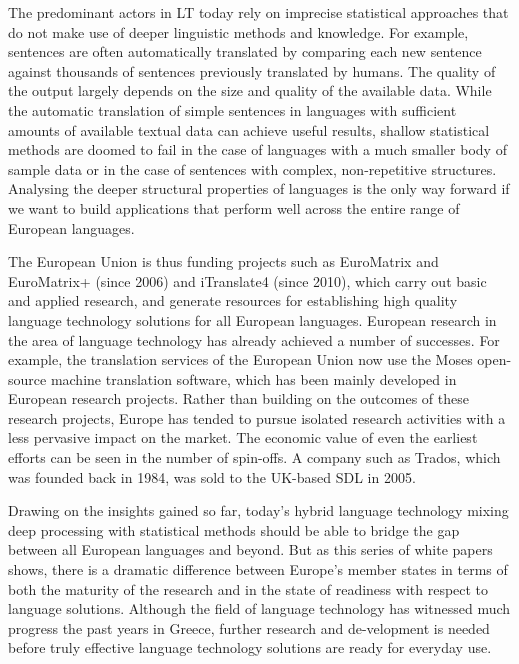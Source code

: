 \begin{multicols}{2}
The predominant actors in LT today rely on imprecise statistical approaches that do not make use of deeper linguistic methods and knowledge. For example, sentences are often automatically translated by comparing each new sentence against thousands of sentences previously translated by humans. The quality of the output largely depends on the size and quality of the available data. While the automatic translation of simple sentences in languages with sufficient amounts of available textual data can achieve useful results, shallow statistical methods are doomed to fail in the case of languages with a much smaller body of sample data or in the case of sentences with complex, non-repetitive structures. Analysing the deeper structural properties of languages is the only way forward if we want to build applications that perform well across the entire range of European languages.


The European Union is thus funding projects such as EuroMatrix and EuroMatrix+ (since 2006) and iTranslate4 (since 2010), which carry out basic and applied research, and generate resources for establishing high quality language technology solutions for all European languages. 
European research in the area of language technology has already achieved a number of successes. For example, the translation services of the European Union now use the Moses open-source machine translation software, which has been mainly developed in European research projects. Rather than building on the outcomes of these research projects, Europe has tended to pursue isolated research activities with a less pervasive impact on the market. The economic value of even the earliest efforts can be seen in the number of spin-offs. A company such as Trados, which was founded back in 1984, was sold to the UK-based SDL in 2005.


Drawing on the insights gained so far, today’s hybrid language technology mixing deep processing with statistical methods should be able to bridge the gap between all European languages and beyond. But as this series of white papers shows, there is a dramatic difference between Europe’s member states in terms of both the maturity of the research and in the state of readiness with respect to language solutions. Although the field of language technology has witnessed much progress the past years in Greece, further research and de-velopment is needed before truly effective language technology solutions are ready for everyday use. 


\end{multicols}
